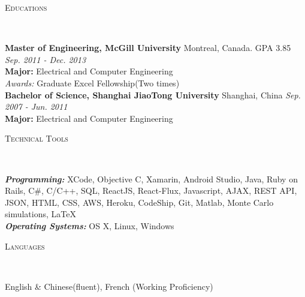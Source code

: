 \documentclass[11pt]{article}
\newenvironment{changemargin}[2]{%
  \begin{list}{}{%
    \setlength{\topsep}{0pt}%
    \setlength{\leftmargin}{#1}%
    \setlength{\rightmargin}{#2}%
    \setlength{\listparindent}{\parindent}%
    \setlength{\itemindent}{\parindent}%
    \setlength{\parsep}{\parskip}%
  }%
  \item[]}{\end{list}
}
\newcommand{\lineover}{
	\begin{changemargin}{-0.05in}{-0.05in}
		\vspace*{-8pt}
		\hrulefill \\
		\vspace*{-2pt}
	\end{changemargin}
}
\newcommand{\header}[1]{
	\begin{changemargin}{-0.5in}{-0.5in}
		\scshape{#1}\\
  	\lineover
	\end{changemargin}
}
\newenvironment{body} {
	\vspace*{-16pt}
	\begin{changemargin}{-0.25in}{-0.5in}
  }	
	{\end{changemargin}
}
\begin{document}
\header{Educations}
\begin{body}
	\vspace{14pt}
	\textbf{Master of Engineering, McGill University} {Montreal, Canada}. GPA 3.85  \hfill \emph{Sep. 2011 - Dec. 2013}{}  \\
	\textbf{Major:} Electrical and Computer Engineering \\
	\emph{Awards:} Graduate Excel Fellowship(Two times)\\

  \medskip	  
	\textbf{Bachelor of Science, Shanghai JiaoTong University} {Shanghai, China}   \hfill \emph{Sep. 2007 - Jun. 2011} \\
	\textbf{Major:} Electrical and Computer Engineering ~~~~~ \\
\end{body}
\smallskip

\header{Technical Tools}
\begin{body}
	\vspace{14pt}
	\emph{\textbf{Programming:}}{} XCode, Objective C, Xamarin, Android Studio, Java, Ruby on Rails, C\#, C/C++, SQL, ReactJS, React-Flux, Javascript, AJAX, REST API, JSON, HTML, CSS, AWS, Heroku, CodeShip, Git, Matlab, Monte Carlo simulations, \LaTeX\\
\medskip
	\emph{\textbf{Operating Systems:}}{} OS X, Linux, Windows\\
\end{body}
\smallskip

\header{Languages}
\begin{body}
	\vspace{14pt}
	English \& Chinese(fluent), French (Working Proficiency)\\
\end{body}
\smallskip
\end{document}
